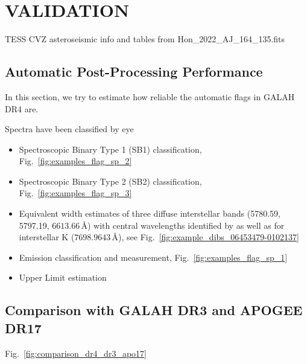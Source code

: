 \documentclass[
  journal=pasa,
  manuscript=research-paper, %
  year=2024,
  volume=37
]{cup-journal}
\begin{document}
\section{VALIDATION}
\label{sec:validation}

TESS CVZ asteroseismic info \citep{Hon2022} and tables from Hon\_2022\_AJ\_164\_135.fits

\subsection{Automatic Post-Processing Performance}

In this section, we try to estimate how reliable the automatic flags in GALAH DR4 are.

Spectra have been classified by eye

\begin{itemize}
    \item Spectroscopic Binary Type 1 (SB1) classification, Fig.~\ref{fig:examples_flag_sp_2}
    \item Spectroscopic Binary Type 2 (SB2) classification, Fig.~\ref{fig:examples_flag_sp_3}
    \item Equivalent width estimates of three diffuse interstellar bands (5780.59, 5797.19, $6613.66\,\text{\AA}$) with central wavelengths identified by \citet{Vogrincic2023} as well as for interstellar K ($7698.9643\,\text{\AA}$), see Fig.~\ref{fig:example_dibs_06453479-0102137}
    \item Emission classification and measurement, Fig.~\ref{fig:examples_flag_sp_1}
    \item Upper Limit estimation
\end{itemize}

\subsection{Comparison with GALAH DR3 and APOGEE DR17}

Fig.~\ref{fig:comparison_dr4_dr3_apo17}
\end{document}
